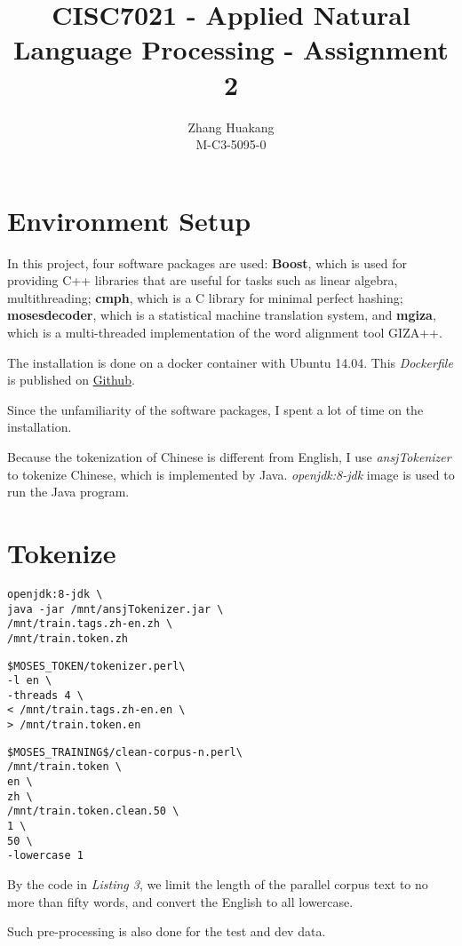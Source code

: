 \documentclass[11pt]{article}
\title{CISC7021 - Applied Natural Language Processing - Assignment 2}
\author{Zhang Huakang\\
M-C3-5095-0
}
\date{}
\begin{document}
\maketitle

\section{Environment Setup}
In this project, four software packages are used: \textbf{Boost}, which is used for providing C++ libraries that are useful for tasks such as linear algebra, multithreading; \textbf{cmph}, which is a C library for minimal perfect hashing; \textbf{mosesdecoder}, which is a statistical machine translation system, and \textbf{mgiza}, which is a multi-threaded implementation of the word alignment tool GIZA++. 

The installation is done on a docker container with Ubuntu 14.04. This \textit{Dockerfile} is published on \href{https://github.com/BoxMars/NLP-HW/blob/main/Assignment2/Dockerfile}{Github}.

Since the unfamiliarity of the software packages, I spent a lot of time on the installation.

Because the tokenization of Chinese is different from English, I use \textit{ansjTokenizer} to tokenize Chinese, which is implemented by Java. \textit{openjdk:8-jdk} image is used to run the Java program.

\section{Tokenize}
\begin{lstlisting}[caption=Chinese Tokenization]
openjdk:8-jdk \
java -jar /mnt/ansjTokenizer.jar \
/mnt/train.tags.zh-en.zh \
/mnt/train.token.zh 
\end{lstlisting}
\begin{lstlisting}[caption=English Tokenization]
$MOSES_TOKEN/tokenizer.perl\
-l en \
-threads 4 \
< /mnt/train.tags.zh-en.en \
> /mnt/train.token.en 
\end{lstlisting}
\begin{lstlisting}[caption=Reduce Parallel Corpus]
$MOSES_TRAINING$/clean-corpus-n.perl\
/mnt/train.token \
en \
zh \
/mnt/train.token.clean.50 \
1 \
50 \
-lowercase 1
\end{lstlisting}
By the code in \textit{Listing 3}, we limit the length of the parallel corpus text to no more than fifty words, and convert the English to all lowercase.

Such pre-processing is also done for the test and dev data.
\end{document}
